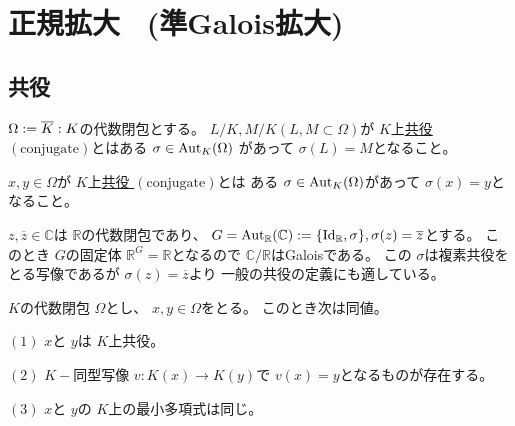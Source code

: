 \documentclass[../master_galois_theory]{subfiles}
\begin{document}
\setcounter{section}{10}

\section{正規拡大 \  (準Galois拡大)}

\subsection{共役}

\begin{defi}
  $\Omega := \overline{K} : K$の代数閉包とする。
  $L/K , M/K (L , M \subset \Omega)$が $K$上\underline{共役 $(\mathrm{conjugate})$}とはある $\sigma \in \mathrm{Aut}_K(\Omega)$
  があって $\sigma (L) = M$となること。

  $x , y \in \Omega$が $K$上\underline{共役 $(\mathrm{conjugate})$}とは
  ある $\sigma \in \mathrm{Aut}_K(\Omega)$があって $\sigma(x) = y$となること。
\end{defi}

\begin{exam}
  $z , \overline{z} \in \mathbb{C}$は $\mathbb{R}$の代数閉包であり、
  $G = \mathrm{Aut}_{\mathbb{R}}(\mathbb{C}) := \{ \mathrm{Id}_{\mathbb{R}} , \sigma \} , \sigma(z) = \overline{z}$とする。
  このとき $G$の固定体 $\mathbb{R}^G = \mathbb{R}$となるので $\mathbb{C}/\mathbb{R}$は\rm{Galois}である。
  この $\sigma$は複素共役をとる写像であるが $\sigma(z) = \overline{z}$より
  一般の共役の定義にも適している。
\end{exam}

\begin{prop} \label{prop:conjugate}
  $K$の代数閉包 $\Omega$とし、
  $x , y \in \Omega$をとる。
  このとき次は同値。

  $(1)$
  $x$と $y$は $K$上共役。

  $(2)$
  $K-$同型写像 $v : K(x) \longrightarrow K(y)$で
  $v(x) = y$となるものが存在する。

  $(3)$
  $x$と $y$の $K$上の最小多項式は同じ。
\end{prop}
\end{document}
